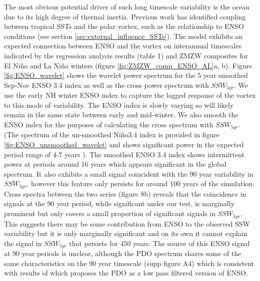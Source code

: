 The most obvious potential driver of such long timescale variability is the ocean due to its high degree of thermal inertia. Previous work has identified coupling between tropical SSTs and the polar vortex, such as the relationship to ENSO conditions (see section \ref{sec:external_influence_SSTs}). The model exhibits an expected connection between ENSO and the vortex on interannual timescales indicated by the regression analysis results (table 1) and ZMZW composites for El Ni\~{n}o and La Ni\~{n}a winters (figure \ref{fig:ZMZW_comp_ENSO_AL}a, b). Figure \ref{fig:ENSO_wavelet} shows the wavelet power spectrum for the 5 year smoothed Sep-Nov ENSO 3.4 index as well as the cross power spectrum with $SSW_{5yr}$. We use the early NH winter ENSO index to capture the lagged response of the vortex to this mode of variability. The ENSO index is slowly varying so will likely remain in the same state between early and mid-winter. We also smooth the ENSO index for the purposes of calculating the cross spectrum with $SSW_{5yr}$. (The spectrum of the un-smoothed Ni\~{n}o3.4 index is provided in figure \ref{fig:ENSO_unsmoothed_wavelet} and shows significant power in the expected period range of 4-7 years \citep{santosoDefining2017}). The smoothed ENSO 3.4 index shows intermittent power at periods around 16 years which appears significant in the global spectrum. It also exhibits a small signal coincident with the 90 year variability in $SSW_{5yr}$, however this feature only persists for around 100 years of the simulation. Cross spectra between the two series (figure 8b) reveals that the coincidence in signals at the 90 year period, while significant under our test, is marginally prominent but only covers a small proportion of significant signals in $SSW_{5yr}$. This suggests there may be some contribution from ENSO to the observed SSW variability but it is only marginally significant and on its own it cannot explain the signal in $SSW_{5yr}$ that persists for 450 years. The source of this ENSO signal at 90 year periods is unclear, although the PDO spectrum shares some of the same characteristics on the 90 year timescale (supp figure A4) which is consistent with results of \cite{Newman2016} which proposes the PDO as a low pass filtered version of ENSO. 

